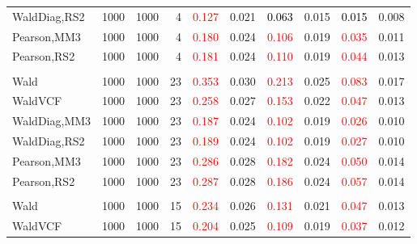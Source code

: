 \documentclass[
]{article}
\begin{document}
\begin{table}[H]
{\begin{tabular}[t]{lrrrrrrlrr}
\hspace{1em}WaldDiag,RS2 & 1000 & 1000 & 4 & \textcolor{red}{0.127} & 0.021 & \textcolor{black}{0.063} & 0.015 & \textcolor{black}{0.015} & 0.008\\
\hspace{1em}Pearson,MM3 & 1000 & 1000 & 4 & \textcolor{red}{0.180} & 0.024 & \textcolor{red}{0.106} & 0.019 & \textcolor{red}{0.035} & 0.011\\
\hspace{1em}Pearson,RS2 & 1000 & 1000 & 4 & \textcolor{red}{0.181} & 0.024 & \textcolor{red}{0.110} & 0.019 & \textcolor{red}{0.044} & 0.013\\
\addlinespace[0.3em]
\multicolumn{10}{l}{\textbf{1F 15V}}\\
\hspace{1em}Wald & 1000 & 1000 & 23 & \textcolor{red}{0.353} & 0.030 & \textcolor{red}{0.213} & 0.025 & \textcolor{red}{0.083} & 0.017\\
\hspace{1em}WaldVCF & 1000 & 1000 & 23 & \textcolor{red}{0.258} & 0.027 & \textcolor{red}{0.153} & 0.022 & \textcolor{red}{0.047} & 0.013\\
\hspace{1em}WaldDiag,MM3 & 1000 & 1000 & 23 & \textcolor{red}{0.187} & 0.024 & \textcolor{red}{0.102} & 0.019 & \textcolor{red}{0.026} & 0.010\\
\hspace{1em}WaldDiag,RS2 & 1000 & 1000 & 23 & \textcolor{red}{0.189} & 0.024 & \textcolor{red}{0.102} & 0.019 & \textcolor{red}{0.027} & 0.010\\
\hspace{1em}Pearson,MM3 & 1000 & 1000 & 23 & \textcolor{red}{0.286} & 0.028 & \textcolor{red}{0.182} & 0.024 & \textcolor{red}{0.050} & 0.014\\
\hspace{1em}Pearson,RS2 & 1000 & 1000 & 23 & \textcolor{red}{0.287} & 0.028 & \textcolor{red}{0.186} & 0.024 & \textcolor{red}{0.057} & 0.014\\
\addlinespace[0.3em]
\multicolumn{10}{l}{\textbf{2F 10V}}\\
\hspace{1em}Wald & 1000 & 1000 & 15 & \textcolor{red}{0.234} & 0.026 & \textcolor{red}{0.131} & 0.021 & \textcolor{red}{0.047} & 0.013\\
\hspace{1em}WaldVCF & 1000 & 1000 & 15 & \textcolor{red}{0.204} & 0.025 & \textcolor{red}{0.109} & 0.019 & \textcolor{red}{0.037} & 0.012\\

\end{tabular}}
\end{table}
\end{document}
